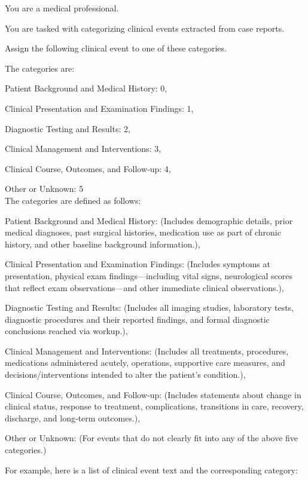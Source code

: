 \documentclass[pmlr,twocolumn,10pt]{jmlr} %
\begin{document}
\begin{tcolorbox}[
  colback=yellow!10,
  colframe=orange!80!black,
  title=Event Categorization Prompt,
  boxrule=2pt
]
\footnotesize
\setlength{\parskip}{1pt}
You are a medical professional. 

You are tasked with categorizing clinical events extracted from case reports.

Assign the following clinical event to one of these categories.

The categories are:

Patient Background and Medical History: 0,

Clinical Presentation and Examination Findings: 1,

Diagnostic Testing and Results: 2,

Clinical Management and Interventions: 3,

Clinical Course, Outcomes, and Follow‐up: 4,

Other or Unknown: 5
\\
The categories are defined as follows:

Patient Background and Medical History: (Includes demographic details, prior medical diagnoses, past surgical histories, medication use as part of chronic history, and other baseline background information.),

Clinical Presentation and Examination Findings: (Includes symptoms at presentation, physical exam findings---including vital signs, neurological scores that reflect exam observations---and other immediate clinical observations.),

Diagnostic Testing and Results: (Includes all imaging studies, laboratory tests, diagnostic procedures and their reported findings, and formal diagnostic conclusions reached via workup.),

Clinical Management and Interventions: (Includes all treatments, procedures, medications administered acutely, operations, supportive care measures, and decisions/interventions intended to alter the patient’s condition.),

Clinical Course, Outcomes, and Follow‐up: (Includes statements about change in clinical status, response to treatment, complications, transitions in care, recovery, discharge, and long‐term outcomes.),

Other or Unknown: (For events that do not clearly fit into any of the above five categories.)

\color{darkteal}
For example, here is a list of clinical event text and the corresponding category:


\end{tcolorbox}
\end{document}
